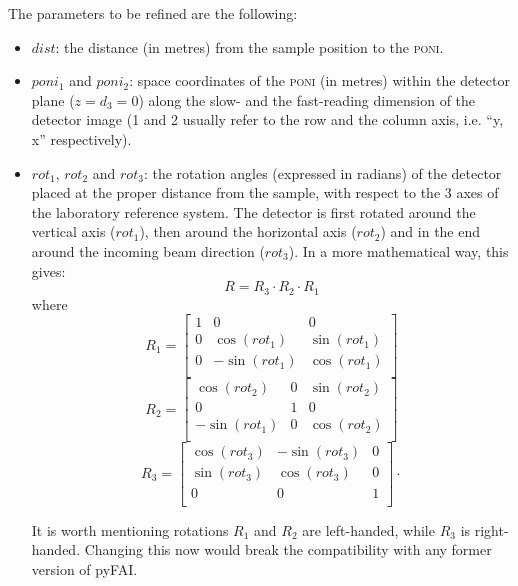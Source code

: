 \documentclass[preprint]{iucr}              %
\begin{document}
The parameters to be refined are the following:
\begin{itemize}
  \item $dist$: the distance (in metres) from the sample position to the
  \textsc{poni}.
  \item $poni_1$ and $poni_2$: space coordinates of the
  \textsc{poni} (in metres) within the detector plane ($z=d_3=0$) along the slow-
  and the fast-reading dimension of the detector image (1 and 2 usually refer to the row
  and the column axis, i.e. ``y, x'' respectively).
  \item $rot_1$, $rot_2$ and $rot_3$: the
  rotation angles (expressed in radians) of the detector placed at the proper
  distance from the sample, with respect to the 3 axes of the
  laboratory reference system.
  The detector is first rotated around the vertical axis ($rot_1$), then
  around the horizontal axis ($rot_2$) and in the end around the
  incoming beam direction ($rot_3$). In a more mathematical way, this gives:
\begin{equation}
	R = R_3 \cdot R_2 \cdot R_1 
\end{equation}
where
\begin{equation}
	R_1 = 	
	\begin{bmatrix}
	1 & 0 & 0\\
	0 & \cos(rot_1) & \sin(rot_1) \\
	0 & -\sin(rot_1) & \cos(rot_1) \\
	\end{bmatrix}
\end{equation}
\begin{equation} 		
	R_2 =
	\begin{bmatrix}
	\cos(rot_2) & 0 & \sin(rot_2) \\
	0 & 1 & 0 \\
	-\sin(rot_1)&0 & \cos(rot_2) \\
	\end{bmatrix}
\end{equation}
\begin{equation} 	
	R_3 =
	\begin{bmatrix}
	\cos(rot_3) & -\sin(rot_3) & 0 \\
	\sin(rot_3) & \cos(rot_3) & 0\\
	0 & 0 & 1\\
	\end{bmatrix}
	\cdot 
\end{equation}

It is worth mentioning rotations $R_1$ and $R_2$ are left-handed, while 
$R_3$ is right-handed. Changing this now would break the compatibility with
any former version of pyFAI.
\end{itemize}
\end{document}

